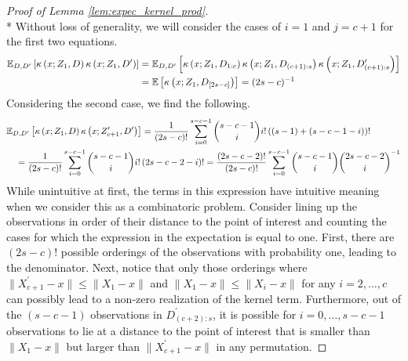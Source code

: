 \begin{proof}[Proof of Lemma \ref{lem:expec_kernel_prod}]\mbox{}\\*
    Without loss of generality, we will consider the cases of $i = 1$ and $j = c + 1$ for the first two equations.
    \begin{equation}
        \begin{aligned}
            \mathbb{E}_{D, D^{\prime}}\left[\kappa\left(x; Z_{1}, D\right)\kappa\left(x; Z_{1}, D^{\prime}\right)\right]
            & = \mathbb{E}_{D, D^{\prime}}\left[\kappa\left(x; Z_{1}, D_{1:c}\right)\kappa\left(x; Z_{1}, D_{(c+1):s}\right)\kappa\left(x; Z_{1}, D^{\prime}_{(c+1):s}\right)\right]\\
            & = \mathbb{E}\left[\kappa\left(x; Z_{1}, D_{[2s - c]}\right)\right]
            = (2s - c)^{-1}
        \end{aligned}
    \end{equation}
    Considering the second case, we find the following.
    \begin{equation}
        \begin{aligned}
            & \mathbb{E}_{D, D^{\prime}}\left[\kappa\left(x; Z_{1}, D\right)\kappa\left(x; Z_{c+1}^{\prime}, D^{\prime}\right)\right]
            = \frac{1}{(2s - c)!} \sum_{i = 0}^{s - c - 1}\binom{s - c - 1}{i} i! \left((s - 1) + (s - c - 1 - i)\right)! \\
            & \quad = \frac{1}{(2s - c)!}\sum_{i = 0}^{s - c - 1}\binom{s - c - 1}{i} i! \left(2s - c - 2 - i\right)! 
            = \frac{(2s - c - 2)!}{(2s - c)!}\sum_{i = 0}^{s - c - 1}\binom{s - c - 1}{i}\binom{2s - c - 2}{i}^{-1}
        \end{aligned}
    \end{equation}
    While unintuitive at first, the terms in this expression have intuitive meaning when we consider this as a combinatoric problem.
    Consider lining up the observations in order of their distance to the point of interest and counting the cases for which the expression in the expectation is equal to one.
    First, there are $(2s-c)!$ possible orderings of the observations with probability one, leading to the denominator.
    Next, notice that only those orderings where $\|X_{c+1}^{\prime} - x\| \leq \|X_{1}-x\|$ and $\|X_{1} - x\| \leq \|X_{i} - x\|$ for any $i = 2, \dotsc, c$ can possibly lead to a non-zero realization of the kernel term.
    Furthermore, out of the $(s-c-1)$ observations in $D^{\prime}_{(c+2):s}$, it is possible for $i = 0, \dotsc, s-c-1$ observations to lie at a distance to the point of interest that is smaller than $\|X_{1}-x\|$ but larger than $\|X_{c+1}^{\prime} - x\|$ in any permutation.

\end{proof}
